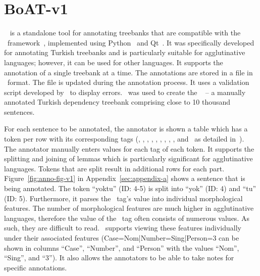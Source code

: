 \section{BoAT-v1}
\label{sec:boatvone}

\boatvone~\cite{turk-etal-2019-turkish} is a standalone tool for annotating treebanks that are compatible with the \ud\ framework~\cite{UD}, implemented using Python~\cite{python} and Qt~\cite{qt}.
It was specifically developed for annotating Turkish treebanks and is particularly suitable for agglutinative languages; however, it can be used for other languages.
It supports the annotation of a single treebank at a time.
The annotations are stored in a file in \conllu\ format.
The file is updated during the annotation process.
It uses a validation script developed by \ud\ to display errors.
\boatvone\ was used to create the \bountreebank~\cite{turk2021resources,UD-Boun-Treebank} -- a manually annotated Turkish dependency treebank comprising close to 10 thousand sentences.

For each sentence to be annotated, the annotator is shown a table which has a token per row with its corresponding tags (\id, \form, \udlemma, \upos, \xpos, \feats, \head, \deprel, \deps, and \misc\ as detailed in~\cite{turk-etal-2019-turkish}).
The annotator manually enters values for each tag of each token.
It supports the splitting and joining of lemmas which is particularly significant for agglutinative languages.
Tokens that are split result in additional rows for each part.
Figure~\ref{fig:anno-fig-v1} in Appendix~\ref{sec:appendix-a} shows a sentence that is being annotated.
The token ``yoktu'' (ID: 4-5) is split into ``yok'' (ID: 4) and ``tu'' (ID: 5). 
Furthermore, it parses the \feats\ tag's value into individual morphological features.
The number of morphological features are much higher in agglutinative languages, therefore the value of the \feats\ tag often consists of numerous values.
As such, they are difficult to read.
\boatvone\ supports viewing these features individually under their associated features (Case=Nom|Number=Sing|Person=3 can be shown in columns ``Case'', ``Number'', and ``Person'' with the values ``Nom'', ``Sing'', and ``3'').
It also allows the annotators to be able to take notes for specific annotations.
